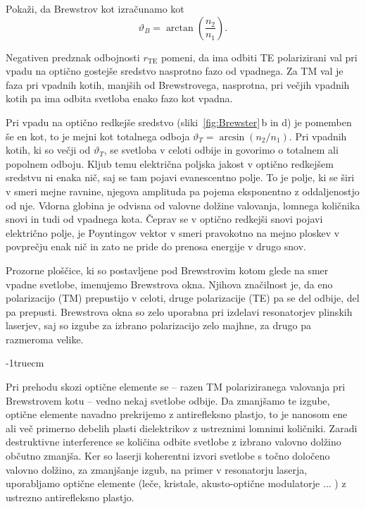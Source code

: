 \begin{definition}
Pokaži, da Brewstrov kot izračunamo kot 
\begin{equation}
\vartheta_{B}=\arctan\left(\frac{n_2}{n_1}\right).
\label{eq:Brew}
\end{equation}
\end{definition}

Negativen predznak odbojnosti $r_{\mathrm{TE}}$ pomeni, da ima odbiti TE 
polarizirani val pri vpadu na optično gostejše sredstvo nasprotno 
fazo od vpadnega. Za TM val je faza pri vpadnih kotih, manjših od Brewstrovega, 
nasprotna, pri večjih vpadnih kotih pa ima odbita svetloba enako fazo kot vpadna. 

Pri vpadu na optično redkejše sredstvo (sliki~\ref{fig:Brewster}\,b in d) je pomemben 
še en kot, to je mejni kot totalnega odboja $\vartheta_T = \arcsin\left(n_2/n_1\right)$. 
Pri vpadnih kotih, ki so večji od $\vartheta_T$, se svetloba v celoti odbije in govorimo
o totalnem ali popolnem odboju. 
Kljub temu električna poljska jakost v optično redkejšem sredstvu
ni enaka nič, saj se tam pojavi evanescentno polje.
To je polje, ki se širi v smeri mejne ravnine, njegova amplituda pa pojema 
eksponentno z oddaljenostjo od nje. Vdorna globina je odvisna od valovne 
dolžine valovanja, lomnega količnika snovi in tudi od vpadnega kota. 
Čeprav se v optično redkejši snovi pojavi električno polje, je Poyntingov
vektor v smeri pravokotno na mejno ploskev v povprečju enak nič in zato ne pride do prenosa energije
v drugo snov. 
\begin{remark}
Prozorne ploščice, ki so postavljene pod Brewstrovim kotom glede na smer vpadne svetlobe, 
imenujemo Brewstrova okna. Njihova značilnost je,
da eno polarizacijo (TM) prepustijo v celoti, druge polarizacije (TE) pa se del odbije, 
del pa prepusti. Brewstrova okna so zelo uporabna pri izdelavi resonatorjev 
plinskih laserjev, saj so izgube za izbrano polarizacijo zelo majhne, 
za drugo pa razmeroma velike.  
\end{remark}
\vglue-1truecm
\begin{remark}
Pri prehodu skozi optične elemente se --
razen TM polariziranega valovanja pri Brewstrovem
kotu -- vedno nekaj
svetlobe odbije. Da zmanjšamo te izgube, optične elemente navadno
prekrijemo z antirefleksno plastjo, to je nanosom ene ali več primerno
debelih plasti dielektrikov z ustreznimi lomnimi količniki.
Zaradi destruktivne interference se količina odbite svetlobe z izbrano
valovno dolžino občutno zmanjša. Ker so laserji
koherentni izvori svetlobe s točno določeno valovno dolžino, za zmanjšanje
izgub, na primer v resonatorju laserja, uporabljamo optične
elemente (leče, kristale, akusto-optične modulatorje ... ) z ustrezno
antirefleksno plastjo.
\end{remark}

